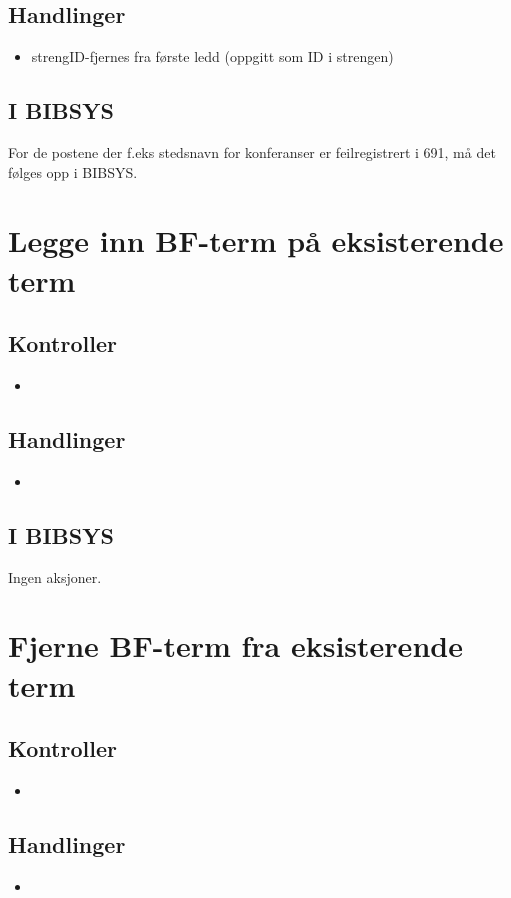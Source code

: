 \documentclass[a4paper,10pt,norsk]{article}
\begin{document}
\subsection*{Handlinger}
\begin{itemize}
\item strengID-fjernes fra første ledd (oppgitt som ID i strengen)
\end{itemize}
\subsection*{I BIBSYS}
For de postene der f.eks stedsnavn for konferanser er feilregistrert i 691, må det følges opp i BIBSYS.

\section{Legge inn BF-term på eksisterende term}
\subsection*{Kontroller}
\begin{itemize}
\item 
\end{itemize}
\subsection*{Handlinger}
\begin{itemize}
\item 
\end{itemize}
\subsection*{I BIBSYS}
Ingen aksjoner.

\section{Fjerne BF-term fra eksisterende term}
\subsection*{Kontroller}
\begin{itemize}
\item 
\end{itemize}
\subsection*{Handlinger}
\begin{itemize}
\item 
\end{itemize}
\end{document}

